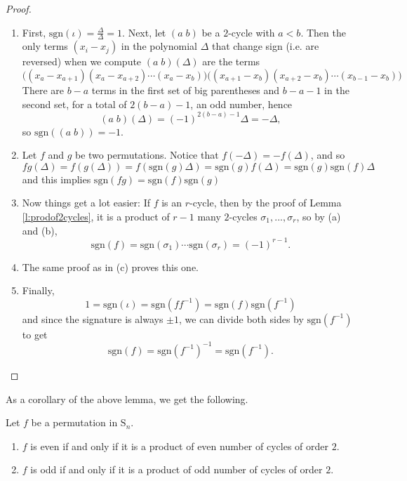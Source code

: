 \documentclass[11pt,dvipsnames]{book}
\numberwithin{figure}{section} %
\numberwithin{table}{section} %
\begin{document}
\begin{proof}
\begin{enumerate}[label=(\alph*)]
\item First, $\mbox{sgn}(\iota)=\frac{\Delta}{\Delta}=1$. Next, let $(a\; b)$ be a $2$-cycle with $a<b$. Then the only terms $(x_{i}-x_{j})$ in the polynomial $\Delta$ that change sign (i.e. are reversed) when we compute $(a\; b)(\Delta)$ are the terms
\[
\Big((x_{a}-x_{a+1})(x_{a}-x_{a+2})\cdots (x_{a}-x_{b})\Big)
\Big((x_{a+1}-x_{b})(x_{a+2}-x_{b})\cdots (x_{b-1}-x_{b})\Big)
\]
There are $b-a$ terms in the first set of big parentheses and $b-a-1$ in the second set, for a total of $2(b-a)-1$, an odd number, hence 
\[
(a\; b)(\Delta) = (-1)^{2(b-a)-1} \Delta = -\Delta,
\]
so $\mbox{sgn}((a\; b))=-1$. 
\item Let $f$ and $g$ be two permutations. Notice that $f(-\Delta)=-f(\Delta)$, and so
\[
fg(\Delta)
=f(g(\Delta)) = f(\mbox{sgn}(g)\Delta) =  \mbox{sgn}(g) f(\Delta)
=\mbox{sgn}(g)\mbox{sgn}(f)\Delta
\]
and this implies $\mathrm{sgn}(fg)=\mathrm{sgn}(f)\mathrm{sgn}(g)$

\item Now things get a lot easier: If $f$ is an $r$-cycle, then by the proof of Lemma \ref{l:prodof2cycles}, it is a product of $r-1$ many $2$-cycles $\sigma_{1},...,\sigma_{r}$, so by (a) and (b),
\[
\mbox{sgn}(f) = \mbox{sgn}(\sigma_{1})\cdots  \mbox{sgn}(\sigma_{r})  =(-1)^{r-1}.\]
\item The same proof as in (c) proves this one. 
\item Finally, 
\[
1= \mbox{sgn}(\iota)  = \mbox{sgn}(ff^{-1})=\mbox{sgn}(f)\mbox{sgn}(f^{-1})
\]
and since the signature is always $\pm 1$, we can divide both sides by $\mbox{sgn}(f^{-1})$ to get 
\[
\mbox{sgn}(f)=\mbox{sgn}(f^{-1})^{-1} = \mbox{sgn}(f^{-1}).
\]
\end{enumerate}

\end{proof}

As a corollary of the above lemma, we get the following.

\begin{corollary}
Let $f$ be a permutation in $\mathrm{S}_n$.
\begin{enumerate}
\item $f$ is \textcolor[rgb]{0.98,0.00,0.00}{even} if and only if it is
a product of even number of cycles of order $2$.

\item $f$ is \textcolor[rgb]{0.98,0.00,0.00}{odd} if and only if it is a
product of odd number of cycles of order $2$.
\end{enumerate}
\end{corollary}
\end{document}
